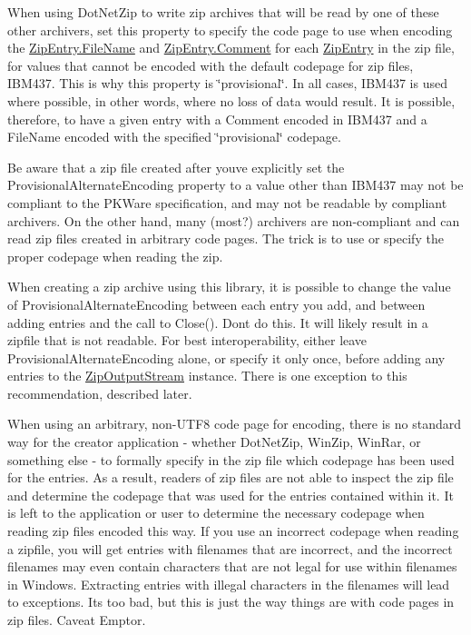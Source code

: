 When using Dot\+Net\+Zip to write zip archives that will be read by one of these other archivers, set this property to specify the code page to use when encoding the \mbox{\hyperlink{class_super_tiled2_unity_1_1_ionic_1_1_zip_1_1_zip_entry_a78e0c5ee8272a51926eabb9ffc1b38d9}{Zip\+Entry.\+File\+Name}} and \mbox{\hyperlink{class_super_tiled2_unity_1_1_ionic_1_1_zip_1_1_zip_entry_a59ecd22f231ce6c16aec38e12a90bd6a}{Zip\+Entry.\+Comment}} for each {\ttfamily \mbox{\hyperlink{class_super_tiled2_unity_1_1_ionic_1_1_zip_1_1_zip_entry}{Zip\+Entry}}} in the zip file, for values that cannot be encoded with the default codepage for zip files, I\+B\+M437. This is why this property is \char`\"{}provisional\char`\"{}. In all cases, I\+B\+M437 is used where possible, in other words, where no loss of data would result. It is possible, therefore, to have a given entry with a {\ttfamily Comment} encoded in I\+B\+M437 and a {\ttfamily File\+Name} encoded with the specified \char`\"{}provisional\char`\"{} codepage. 

Be aware that a zip file created after you\textquotesingle{}ve explicitly set the {\ttfamily Provisional\+Alternate\+Encoding} property to a value other than I\+B\+M437 may not be compliant to the P\+K\+Ware specification, and may not be readable by compliant archivers. On the other hand, many (most?) archivers are non-\/compliant and can read zip files created in arbitrary code pages. The trick is to use or specify the proper codepage when reading the zip. 

When creating a zip archive using this library, it is possible to change the value of {\ttfamily Provisional\+Alternate\+Encoding} between each entry you add, and between adding entries and the call to {\ttfamily Close()}. Don\textquotesingle{}t do this. It will likely result in a zipfile that is not readable. For best interoperability, either leave {\ttfamily Provisional\+Alternate\+Encoding} alone, or specify it only once, before adding any entries to the {\ttfamily \mbox{\hyperlink{class_super_tiled2_unity_1_1_ionic_1_1_zip_1_1_zip_output_stream}{Zip\+Output\+Stream}}} instance. There is one exception to this recommendation, described later. 

When using an arbitrary, non-\/\+U\+T\+F8 code page for encoding, there is no standard way for the creator application -\/ whether Dot\+Net\+Zip, Win\+Zip, Win\+Rar, or something else -\/ to formally specify in the zip file which codepage has been used for the entries. As a result, readers of zip files are not able to inspect the zip file and determine the codepage that was used for the entries contained within it. It is left to the application or user to determine the necessary codepage when reading zip files encoded this way. If you use an incorrect codepage when reading a zipfile, you will get entries with filenames that are incorrect, and the incorrect filenames may even contain characters that are not legal for use within filenames in Windows. Extracting entries with illegal characters in the filenames will lead to exceptions. It\textquotesingle{}s too bad, but this is just the way things are with code pages in zip files. Caveat Emptor. 

